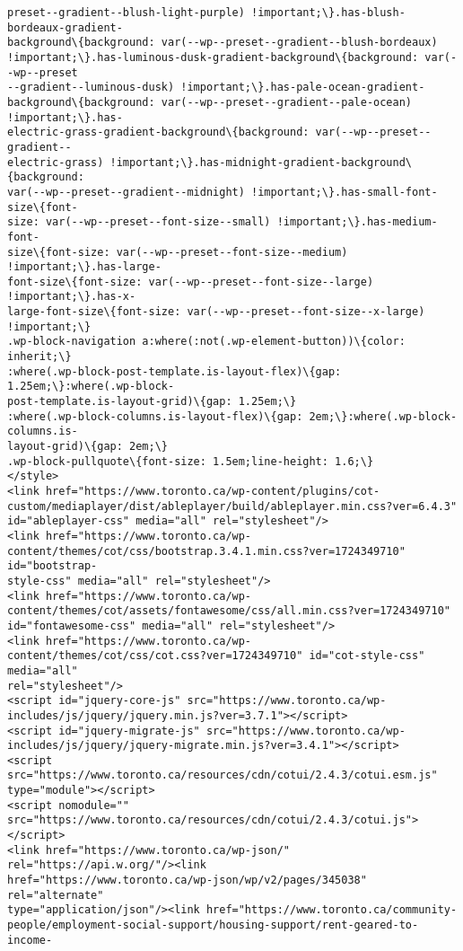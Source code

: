 \documentclass[11pt]{article}
\begin{document}
\begin{Verbatim}[commandchars=\\\{\}]
preset--gradient--blush-light-purple) !important;\}.has-blush-bordeaux-gradient-
background\{background: var(--wp--preset--gradient--blush-bordeaux)
!important;\}.has-luminous-dusk-gradient-background\{background: var(--wp--preset
--gradient--luminous-dusk) !important;\}.has-pale-ocean-gradient-
background\{background: var(--wp--preset--gradient--pale-ocean) !important;\}.has-
electric-grass-gradient-background\{background: var(--wp--preset--gradient--
electric-grass) !important;\}.has-midnight-gradient-background\{background:
var(--wp--preset--gradient--midnight) !important;\}.has-small-font-size\{font-
size: var(--wp--preset--font-size--small) !important;\}.has-medium-font-
size\{font-size: var(--wp--preset--font-size--medium) !important;\}.has-large-
font-size\{font-size: var(--wp--preset--font-size--large) !important;\}.has-x-
large-font-size\{font-size: var(--wp--preset--font-size--x-large) !important;\}
.wp-block-navigation a:where(:not(.wp-element-button))\{color: inherit;\}
:where(.wp-block-post-template.is-layout-flex)\{gap: 1.25em;\}:where(.wp-block-
post-template.is-layout-grid)\{gap: 1.25em;\}
:where(.wp-block-columns.is-layout-flex)\{gap: 2em;\}:where(.wp-block-columns.is-
layout-grid)\{gap: 2em;\}
.wp-block-pullquote\{font-size: 1.5em;line-height: 1.6;\}
</style>
<link href="https://www.toronto.ca/wp-content/plugins/cot-
custom/mediaplayer/dist/ableplayer/build/ableplayer.min.css?ver=6.4.3"
id="ableplayer-css" media="all" rel="stylesheet"/>
<link href="https://www.toronto.ca/wp-
content/themes/cot/css/bootstrap.3.4.1.min.css?ver=1724349710" id="bootstrap-
style-css" media="all" rel="stylesheet"/>
<link href="https://www.toronto.ca/wp-
content/themes/cot/assets/fontawesome/css/all.min.css?ver=1724349710"
id="fontawesome-css" media="all" rel="stylesheet"/>
<link href="https://www.toronto.ca/wp-
content/themes/cot/css/cot.css?ver=1724349710" id="cot-style-css" media="all"
rel="stylesheet"/>
<script id="jquery-core-js" src="https://www.toronto.ca/wp-
includes/js/jquery/jquery.min.js?ver=3.7.1"></script>
<script id="jquery-migrate-js" src="https://www.toronto.ca/wp-
includes/js/jquery/jquery-migrate.min.js?ver=3.4.1"></script>
<script src="https://www.toronto.ca/resources/cdn/cotui/2.4.3/cotui.esm.js"
type="module"></script>
<script nomodule=""
src="https://www.toronto.ca/resources/cdn/cotui/2.4.3/cotui.js"></script>
<link href="https://www.toronto.ca/wp-json/" rel="https://api.w.org/"/><link
href="https://www.toronto.ca/wp-json/wp/v2/pages/345038" rel="alternate"
type="application/json"/><link href="https://www.toronto.ca/community-
people/employment-social-support/housing-support/rent-geared-to-income-

\end{Verbatim}
\end{document}
